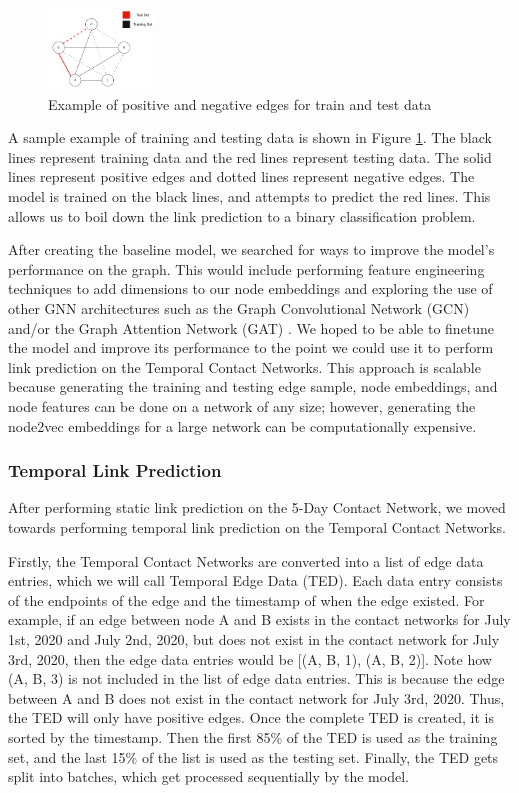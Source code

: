 \documentclass[times, 10pt,twocolumn]{article}
\begin{document}
\begin{figure}
    \centering
    \includegraphics[width=0.25\textwidth]{imgs/static_prediction_data_split.png}
    \caption{Example of positive and negative edges for train and test data}
    \label{fig:toy_edges_label}
\end{figure}

A sample example of training and testing data is shown in Figure \ref{fig:toy_edges_label}. The black lines represent training data and the red lines represent testing data. The solid lines represent positive edges and dotted lines represent negative edges. The model is trained on the black lines, and attempts to predict the red lines. This allows us to boil down the link prediction to a binary classification problem.

After creating the baseline model, we searched for ways to improve the model's performance on the graph. This would include performing feature engineering techniques to add dimensions to our node embeddings and exploring the use of other GNN architectures such as the Graph Convolutional Network (GCN) and/or the Graph Attention Network (GAT) \cite{kipf2017semisupervised} \cite{veličković2018graph}. We hoped to be able to finetune the model and improve its performance to the point we could use it to perform link prediction on the Temporal Contact Networks. This approach is scalable because generating the training and testing edge sample, node embeddings, and node features can be done on a network of any size; however, generating the node2vec embeddings for a large network can be computationally expensive.

\subsubsection{Temporal Link Prediction}
After performing static link prediction on the 5-Day Contact Network, we moved towards performing temporal link prediction on the Temporal Contact Networks.

Firstly, the Temporal Contact Networks are converted into a list of edge data entries, which we will call Temporal Edge Data (TED). Each data entry consists of the endpoints of the edge and the timestamp of when the edge existed. For example, if an edge between node A and B exists in the contact networks for July 1st, 2020 and July 2nd, 2020, but does not exist in the contact network for July 3rd, 2020, then the edge data entries would be [(A, B, 1), (A, B, 2)]. Note how (A, B, 3) is not included in the list of edge data entries. This is because the edge between A and B does not exist in the contact network for July 3rd, 2020. Thus, the TED will only have positive edges. Once the complete TED is created, it is sorted by the timestamp. Then the first 85\% of the TED is used as the training set, and the last 15\% of the list is used as the testing set. Finally, the TED gets split into batches, which get processed sequentially by the model.
\end{document}
